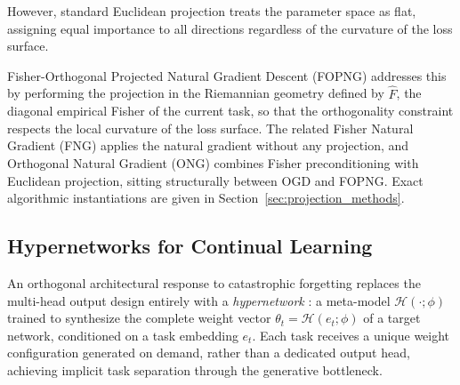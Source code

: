 However, standard Euclidean projection treats the parameter space as flat,
assigning equal importance to all directions regardless of the curvature of
the loss surface.

Fisher-Orthogonal Projected Natural Gradient Descent (FOPNG)
\citep{garg_fisher-orthogonal_2026} addresses this by performing the
projection in the Riemannian geometry defined by $\hat{F}$, the diagonal
empirical Fisher of the current task, so that the orthogonality constraint
respects the local curvature of the loss surface.
The related Fisher Natural Gradient (FNG) \citep{garg_fisher-orthogonal_2026}
applies the natural gradient without any projection, and Orthogonal Natural
Gradient (ONG) \citep{yadav_ong_2025} combines Fisher preconditioning with
Euclidean projection, sitting structurally between OGD and FOPNG.
Exact algorithmic instantiations are given in Section~\ref{sec:projection_methods}.

\subsection{Hypernetworks for Continual Learning}
An orthogonal architectural response to catastrophic forgetting replaces the
multi-head output design entirely with a \emph{hypernetwork}
\citep{ha_hypernetworks_2017}: a meta-model
$\mathcal{H}(\cdot;\phi)$ trained to synthesize the complete weight
vector $\theta_t = \mathcal{H}(e_t;\phi)$ of a target network,
conditioned on a task embedding $e_t$.
Each task receives a unique weight configuration generated on demand, rather
than a dedicated output head, achieving implicit task separation through the
generative bottleneck.

